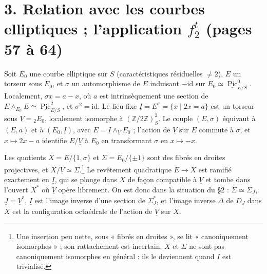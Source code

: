 \documentclass[11pt,a4paper]{article}
\begin{document}
\section*{3. Relation avec les courbes elliptiques ; l'application $f^t_2$ (pages 57 à 64)}

Soit $E_0$ une courbe elliptique sur $S$ (caractéristiques résiduelles
$\neq 2$), $E$ un torseur sous $E_0$, et $\sigma$ un automorphisme de $E$
induisant $-\mathrm{id}$ sur $E_0 \simeq \underline{\operatorname{Pic}}^0_{E/S}$.
Localement, $\sigma x = a - x$, où $a$ est intrinsèquement une section de
$E \wedge_{E_0} E \simeq \underline{\operatorname{Pic}}^2_{E/S}$, et $\sigma^2 =
\mathrm{id}$. Le lieu fixe $\underline{I} = E^{\sigma} = \{x \mid 2x = a\}$ est
un torseur sous $\underline{V} = {}_2E_0$, localement isomorphe à
$(\mathbb{Z}/2\mathbb{Z})^2_S$. Le couple $(E, \sigma)$ équivaut à $(E, a)$ et à
$(E_0, \underline{I})$, avec $E = \underline{I} \wedge_{\underline{V}} E_0$ ;
l'action de $\underline{V}$ sur $E$ commute à $\sigma$, et $x \mapsto 2x - a$
identifie $E/\underline{V}$ à $E_0$ en transformant $\sigma$ en $x \mapsto -x$.

Les quotients $X = E/\{1, \sigma\}$ et $\Sigma = E_0 / \{\pm 1\}$ sont des
fibrés en droites projectives, et $X/\underline{V} \simeq \Sigma$.\footnote{Une
insertion peu nette, sous « fibrés en droites », se lit « canoniquement
isomorphes » ; son rattachement est incertain. $X$ et $\Sigma$ ne sont pas
canoniquement isomorphes en général : ils le deviennent quand $\underline{I}$
est trivialisé.} Le revêtement quadratique $E \to X$ est ramifié exactement en
$\underline{I}$, qui se plonge dans $X$ de façon compatible à $\underline{V}$ et
tombe dans l'ouvert $X^{*}$ où $\underline{V}$ opère librement. On est donc dans
la situation du §2 : $\Sigma \simeq \Sigma_{\underline{J}}$, $\underline{J} =
\underline{V}^{*}$, $\underline{I}$ est l'image inverse d'une section de
$\Sigma^{*}_{\underline{J}}$, et l'image inverse $\Delta$ de $D_{\underline{J}}$
dans $X$ est la configuration octaédrale de l'action de $\underline{V}$ sur $X$.
\end{document}
